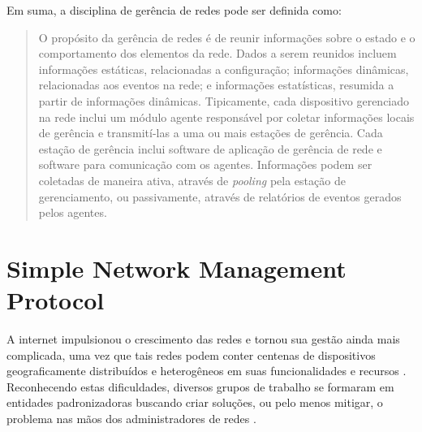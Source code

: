 \documentclass[twoside,english,brazilian]{UNISINOSmonografia}
\begin{document}
Em suma, a disciplina de gerência de redes pode ser definida como:

\begin{quote}
O propósito da gerência de redes é de reunir informações sobre o estado e o 
comportamento dos elementos da rede.
Dados a serem reunidos incluem informações estáticas, relacionadas a 
configuração; informações dinâmicas, relacionadas aos eventos na rede; e 
informações estatísticas, resumida a partir de informações dinâmicas.
Tipicamente, cada dispositivo gerenciado na rede inclui um módulo agente 
responsável por coletar informações locais de gerência e transmití-las a uma 
ou mais estações de gerência.
Cada estação de gerência inclui software de aplicação de gerência de rede e 
software para comunicação com os agentes.
Informações podem ser coletadas de maneira ativa, através de \textit{pooling} 
pela estação de gerenciamento, ou passivamente, através de relatórios de 
eventos gerados pelos agentes.
\cite[p.~45]{stallings1999snmp}
\end{quote}




\section{Simple Network Management Protocol}

A internet impulsionou o crescimento das redes e tornou sua gestão ainda mais 
complicada, uma vez que tais redes podem conter centenas de dispositivos 
geograficamente distribuídos e heterogêneos em suas funcionalidades e recursos
\cite{stallings1999snmp}.
Reconhecendo estas dificuldades, diversos grupos de trabalho se formaram em 
entidades padronizadoras buscando criar soluções, ou pelo menos mitigar, o 
problema nas mãos dos administradores de redes
\cite{Leinwand1996}.
\end{document}
